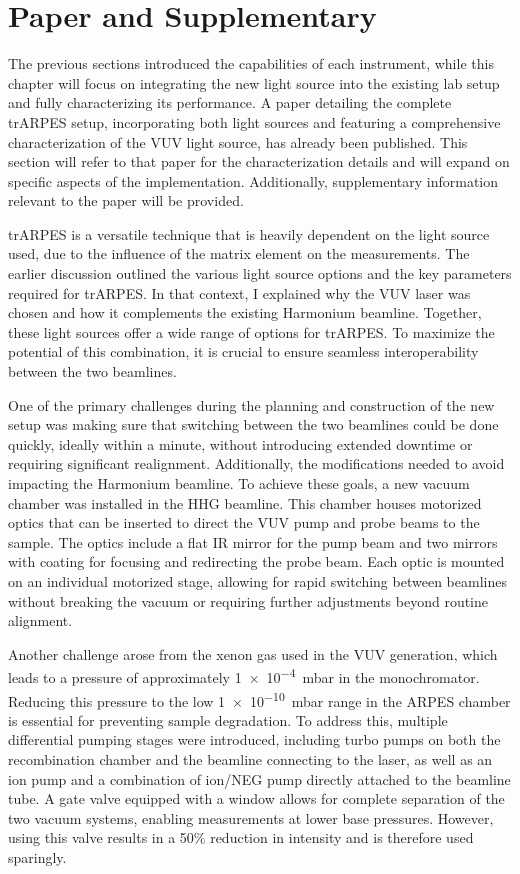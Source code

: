 \section{Paper and Supplementary}

The previous sections introduced the capabilities of each instrument, while this chapter will focus on integrating the new light source into the existing lab setup and fully characterizing its performance.
A paper detailing the complete trARPES setup, incorporating both light sources and featuring a comprehensive characterization of the VUV light source, has already been published.
This section will refer to that paper for the characterization details and will expand on specific aspects of the implementation.
Additionally, supplementary information relevant to the paper will be provided.

trARPES is a versatile technique that is heavily dependent on the light source used, due to the influence of the matrix element on the measurements.
The earlier discussion outlined the various light source options and the key parameters required for trARPES.
In that context, I explained why the VUV laser was chosen and how it complements the existing Harmonium beamline.
Together, these light sources offer a wide range of options for trARPES.
To maximize the potential of this combination, it is crucial to ensure seamless interoperability between the two beamlines.

One of the primary challenges during the planning and construction of the new setup was making sure that switching between the two beamlines could be done quickly, ideally within a minute, without introducing extended downtime or requiring significant realignment.
Additionally, the modifications needed to avoid impacting the Harmonium beamline.
To achieve these goals, a new vacuum chamber was installed in the HHG beamline.
This chamber houses motorized optics that can be inserted to direct the VUV pump and probe beams to the sample.
The optics include a flat IR mirror for the pump beam and two  mirrors with  coating for focusing and redirecting the probe beam.
Each optic is mounted on an individual motorized stage, allowing for rapid switching between beamlines without breaking the vacuum or requiring further adjustments beyond routine alignment.

Another challenge arose from the xenon gas used in the VUV generation, which leads to a pressure of approximately \qty{1e-4}{\milli\bar} in the monochromator.
Reducing this pressure to the low \qty{1e-10}{\milli\bar} range in the ARPES chamber is essential for preventing sample degradation.
To address this, multiple differential pumping stages were introduced, including turbo pumps on both the recombination chamber and the beamline connecting to the laser, as well as an ion pump and a combination of ion/NEG pump directly attached to the beamline tube.
A gate valve equipped with a  window allows for complete separation of the two vacuum systems, enabling measurements at lower base pressures.
However, using this valve results in a 50\% reduction in intensity and is therefore used sparingly.

